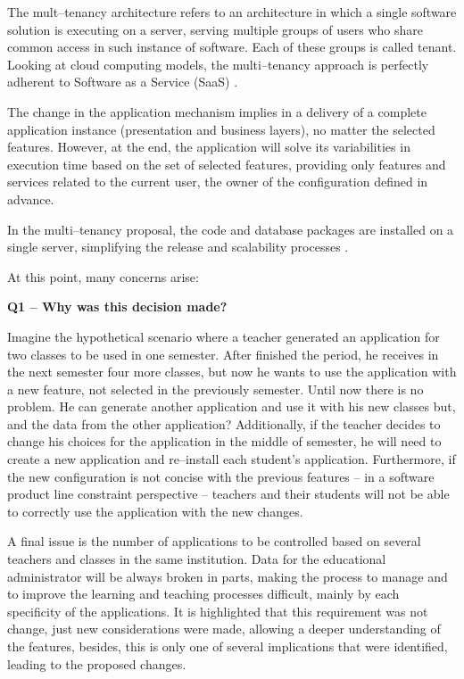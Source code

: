 The mult--tenancy architecture refers to an architecture in which a single software solution is executing on a server, serving multiple groups of users who share common access in such instance of software. Each of these groups is called tenant. Looking at cloud computing models, the multi--tenancy approach is perfectly adherent to Software as a Service (SaaS) \cite{krebs2012architectural}.

The change in the application mechanism implies in a delivery of a complete application instance (presentation and business layers), no matter the selected features. However, at the end, the application will solve its variabilities in execution time based on the set of selected features, providing only features and services related to the current user, the owner of the configuration defined in advance.

In the multi--tenancy proposal, the code and database packages are installed on a single server, simplifying the release and scalability processes \cite{krebs2012architectural}.

At this point, many concerns arise:


\textbf{Q1 -- Why was this decision made?}

Imagine the hypothetical scenario where a teacher generated an application for two classes to be used in one semester. After finished the period, he receives in the next semester four more classes, but now he wants to use the application with a new feature, not selected in the previously semester. Until now there is no problem. He can generate another application and use it with his new classes but, and the data from the other application? Additionally, if the teacher decides to change his choices for the application in the middle of semester, he will need to create a new application and re--install each student's application. Furthermore, if the new configuration is not concise with the previous features -- in a software product line constraint perspective -- teachers and their students will not be able to correctly use the application with the new changes. 

A final issue is the number of applications to be controlled based on several teachers and classes in the same institution. Data for the educational administrator will be always broken in parts, making the process to manage and to improve the learning and teaching processes difficult, mainly by each specificity of the applications. It is highlighted that this requirement was not change, just new considerations were made, allowing a deeper understanding of the features, besides, this is only one of several implications that were identified, leading to the proposed changes.




